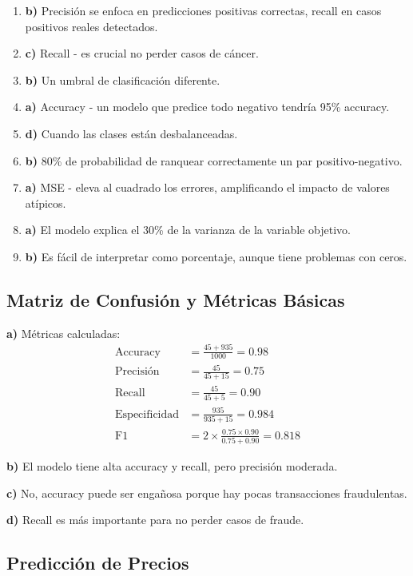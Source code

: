 \documentclass[12pt]{article}
\begin{document}
\begin{enumerate}
    \item \textbf{b)} Precisión se enfoca en predicciones positivas correctas, recall en casos positivos reales detectados.
    \item \textbf{c)} Recall - es crucial no perder casos de cáncer.
    \item \textbf{b)} Un umbral de clasificación diferente.
    \item \textbf{a)} Accuracy - un modelo que predice todo negativo tendría 95\% accuracy.
    \item \textbf{d)} Cuando las clases están desbalanceadas.
    \item \textbf{b)} 80\% de probabilidad de ranquear correctamente un par positivo-negativo.
    \item \textbf{a)} MSE - eleva al cuadrado los errores, amplificando el impacto de valores atípicos.
    \item \textbf{a)} El modelo explica el 30\% de la varianza de la variable objetivo.
    \item \textbf{b)} Es fácil de interpretar como porcentaje, aunque tiene problemas con ceros.
\end{enumerate}

\subsection{Matriz de Confusión y Métricas Básicas}

\textbf{a)} Métricas calculadas:
\begin{align*}
\text{Accuracy} &= \frac{45 + 935}{1000} = 0.98 \\
\text{Precisión} &= \frac{45}{45 + 15} = 0.75 \\
\text{Recall} &= \frac{45}{45 + 5} = 0.90 \\
\text{Especificidad} &= \frac{935}{935 + 15} = 0.984 \\
\text{F1} &= 2 \times \frac{0.75 \times 0.90}{0.75 + 0.90} = 0.818
\end{align*}

\textbf{b)} El modelo tiene alta accuracy y recall, pero precisión moderada.

\textbf{c)} No, accuracy puede ser engañosa porque hay pocas transacciones fraudulentas.

\textbf{d)} Recall es más importante para no perder casos de fraude.

\subsection{Predicción de Precios}
\end{document}
